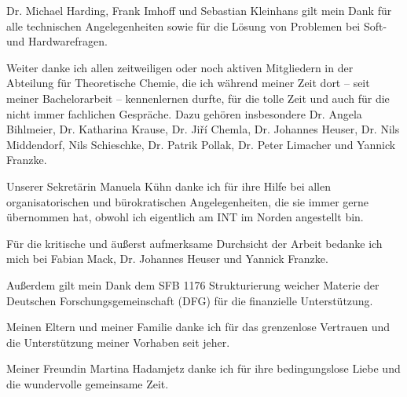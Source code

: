 Dr. Michael Harding, Frank Imhoff und Sebastian Kleinhans gilt mein Dank für alle technischen Angelegenheiten sowie für die Lösung von Problemen bei Soft- und Hardwarefragen. 

Weiter danke ich allen zeitweiligen oder noch aktiven Mitgliedern in der Abteilung für Theoretische Chemie, die ich während meiner Zeit dort -- seit meiner Bachelorarbeit -- kennenlernen durfte, für die tolle Zeit und auch für die nicht immer fachlichen Gespräche. Dazu gehören insbesondere Dr. Angela Bihlmeier, Dr. Katharina Krause, Dr. Jiří Chemla, Dr. Johannes Heuser, Dr. Nils  Middendorf, Nils Schieschke, Dr. Patrik Pollak, Dr. Peter Limacher und Yannick Franzke.

Unserer Sekretärin Manuela Kühn danke ich für ihre Hilfe bei allen organisatorischen und bürokratischen Angelegenheiten, die sie immer gerne übernommen hat, obwohl ich eigentlich am INT im Norden angestellt bin.

\bigskip
Für die kritische und äußerst aufmerksame Durchsicht der Arbeit bedanke ich mich bei Fabian Mack, Dr. Johannes Heuser und Yannick Franzke.

\bigskip
Außerdem gilt mein Dank dem SFB 1176 \glqq Strukturierung weicher Materie\grqq{} der Deutschen Forschungsgemeinschaft (DFG) für die finanzielle Unterstützung.

\bigskip
Meinen Eltern und meiner Familie danke ich für das grenzenlose Vertrauen und die Unterstützung meiner Vorhaben seit jeher. 

\bigskip
Meiner Freundin Martina Hadamjetz danke ich für ihre bedingungslose Liebe und die wundervolle gemeinsame Zeit. 
